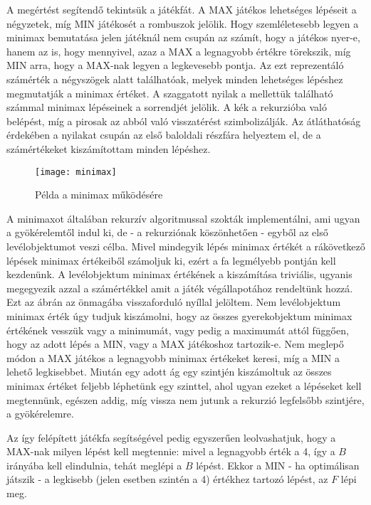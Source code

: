 A megértést segítendő tekintsük a  játékfát. A MAX játékos lehetséges lépéseit a négyzetek, míg MIN játékosét a rombuszok jelölik. Hogy szemléletesebb legyen a minimax bemutatása jelen játéknál nem csupán az számít, hogy a játékos nyer-e, hanem az is, hogy mennyivel, azaz a MAX a legnagyobb értékre törekszik, míg MIN arra, hogy a MAX-nak legyen a legkevesebb pontja. Az ezt reprezentáló számérték a négyszögek alatt találhatóak, melyek minden lehetséges lépéshez megmutatják a minimax értéket. A szaggatott nyilak a mellettük található számmal minimax lépéseinek a sorrendjét jelölik. A kék a rekurzióba való belépést, míg a pirosak az abból való visszatérést szimbolizálják. Az átláthatóság érdekében a nyilakat csupán az első baloldali részfára helyeztem el, de a számértékeket kiszámítottam minden lépéshez. \ujsor

\begin{figure}[ht]
	\texttt{[image: minimax]}
	\centering
	\caption{Példa a minimax működésére}
	\label{fig:minimax}
\end{figure}

A minimaxot általában rekurzív algoritmussal szokták implementálni, ami ugyan a gyökérelemtől indul ki, de - a rekurziónak köszönhetően - egyből az első levélobjektumot veszi célba. Mivel mindegyik lépés minimax értékét a rákövetkező lépések minimax értékeiből számoljuk ki, ezért a fa legmélyebb pontján kell kezdenünk. A levélobjektum minimax értékének a kiszámítása triviális, ugyanis megegyezik azzal a számértékkel amit a játék végállapotához rendeltünk hozzá. Ezt az ábrán az önmagába visszaforduló nyíllal jelöltem. Nem levélobjektum minimax érték úgy tudjuk kiszámolni, hogy az összes gyerekobjektum minimax értékének vesszük vagy a minimumát, vagy pedig a maximumát attól függően, hogy az adott lépés a MIN, vagy a MAX játékoshoz tartozik-e. Nem meglepő módon a MAX játékos a legnagyobb minimax értékeket keresi, míg a MIN a lehető legkisebbet. Miután egy adott ág egy szintjén kiszámoltuk az összes minimax értéket feljebb léphetünk egy szinttel, ahol ugyan ezeket a lépéseket kell megtennünk, egészen addig, míg vissza nem jutunk a rekurzió legfelsőbb szintjére, a gyökérelemre.\ujsor

Az így felépített játékfa segítségével pedig egyszerűen leolvashatjuk, hogy a MAX-nak milyen lépést kell megtennie: mivel a legnagyobb érték a 4, így a $B$ irányába kell elindulnia, tehát meglépi a $B$ lépést. Ekkor a MIN - ha optimálisan játszik - a legkisebb (jelen esetben szintén a 4) értékhez tartozó lépést, az $F$ lépi meg.\ujsor

